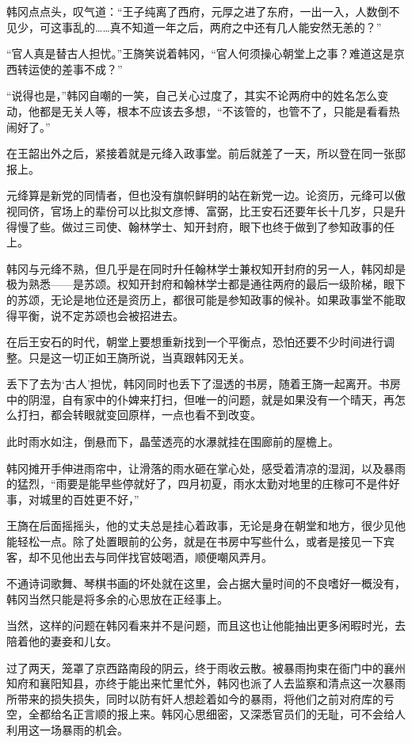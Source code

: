 韩冈点点头，叹气道：“王子纯离了西府，元厚之进了东府，一出一入，人数倒不见少，可这事乱的……真不知道一年之后，两府之中还有几人能安然无恙的？”

“官人真是替古人担忧。”王旖笑说着韩冈，“官人何须操心朝堂上之事？难道这是京西转运使的差事不成？”

“说得也是，”韩冈自嘲的一笑，自己关心过度了，其实不论两府中的姓名怎么变动，他都是无关人等，根本不应该去多想，“不该管的，也管不了，只能是看看热闹好了。”

在王韶出外之后，紧接着就是元绛入政事堂。前后就差了一天，所以登在同一张邸报上。

元绛算是新党的同情者，但也没有旗帜鲜明的站在新党一边。论资历，元绛可以傲视同侪，官场上的辈份可以比拟文彦博、富弼，比王安石还要年长十几岁，只是升得慢了些。做过三司使、翰林学士、知开封府，眼下也终于做到了参知政事的任上。

韩冈与元绛不熟，但几乎是在同时升任翰林学士兼权知开封府的另一人，韩冈却是极为熟悉——是苏颂。权知开封府和翰林学士都是通往两府的最后一级阶梯，眼下的苏颂，无论是地位还是资历上，都很可能是参知政事的候补。如果政事堂不能取得平衡，说不定苏颂也会被招进去。

在后王安石的时代，朝堂上要想重新找到一个平衡点，恐怕还要不少时间进行调整。只是这一切正如王旖所说，当真跟韩冈无关。

丢下了去为‘古人’担忧，韩冈同时也丢下了湿透的书房，随着王旖一起离开。书房中的阴湿，自有家中的仆婢来打扫，但唯一的问题，就是如果没有一个晴天，再怎么打扫，都会转眼就变回原样，一点也看不到改变。

此时雨水如注，倒悬而下，晶莹透亮的水瀑就挂在围廊前的屋檐上。

韩冈摊开手伸进雨帘中，让滑落的雨水砸在掌心处，感受着清凉的湿润，以及暴雨的猛烈，“雨要是能早些停就好了，四月初夏，雨水太勤对地里的庄稼可不是件好事，对城里的百姓更不好，”

王旖在后面摇摇头，他的丈夫总是挂心着政事，无论是身在朝堂和地方，很少见他能轻松一点。除了处置眼前的公务，就是在书房中写些什么，或者是接见一下宾客，却不见他出去与同伴找官妓喝酒，顺便嘲风弄月。

不通诗词歌舞、琴棋书画的坏处就在这里，会占据大量时间的不良嗜好一概没有，韩冈当然只能是将多余的心思放在正经事上。

当然，这样的问题在韩冈看来并不是问题，而且这也让他能抽出更多闲暇时光，去陪着他的妻妾和儿女。

过了两天，笼罩了京西路南段的阴云，终于雨收云散。被暴雨拘束在衙门中的襄州知府和襄阳知县，亦终于能出来忙里忙外，韩冈也派了人去监察和清点这一次暴雨所带来的损失损失，同时以防有奸人想趁着如今的暴雨，将他们之前对府库的亏空，全都给名正言顺的报上来。韩冈心思细密，又深悉官员们的无耻，可不会给人利用这一场暴雨的机会。

